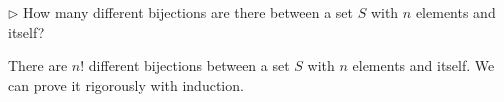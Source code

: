 \documentclass[parskip=full]{scrartcl}
\begin{document}
\begin{prob}{1}
    \(\triangleright\) How many different bijections are there between a set \(S\) with \(n\) elements and itself?
\end{prob}
\begin{sol}
    There are \(n!\) different bijections between a set \(S\) with \(n\) elements and itself. We can prove it rigorously with induction.
\end{sol}
\end{document}
